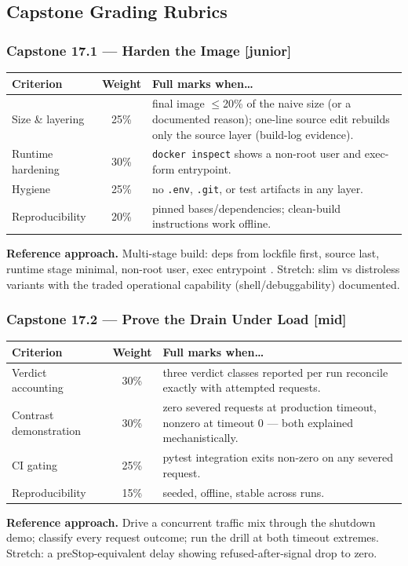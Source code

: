 \subsection{Capstone Grading Rubrics}

\subsubsection*{Capstone 17.1 --- Harden the Image [junior]}
\begin{center}\small
\begin{tabularx}{\textwidth}{l c X}
\toprule
\textbf{Criterion} & \textbf{Weight} & \textbf{Full marks when\ldots} \\
\midrule
Size \& layering & 25\% & final image $\le$20\% of the naive size (or a documented reason); one-line source edit rebuilds only the source layer (build-log evidence). \\
Runtime hardening & 30\% & \texttt{docker inspect} shows a non-root user and exec-form entrypoint. \\
Hygiene & 25\% & no \texttt{.env}, \texttt{.git}, or test artifacts in any layer. \\
Reproducibility & 20\% & pinned bases/dependencies; clean-build instructions work offline. \\
\bottomrule
\end{tabularx}
\end{center}
\textbf{Reference approach.} Multi-stage build: deps from lockfile first,
source last, runtime stage minimal, non-root user, exec entrypoint
\cite{twelvefactor}. Stretch: slim vs distroless variants with the traded
operational capability (shell/debuggability) documented.

\subsubsection*{Capstone 17.2 --- Prove the Drain Under Load [mid]}
\begin{center}\small
\begin{tabularx}{\textwidth}{l c X}
\toprule
\textbf{Criterion} & \textbf{Weight} & \textbf{Full marks when\ldots} \\
\midrule
Verdict accounting & 30\% & three verdict classes reported per run reconcile exactly with attempted requests. \\
Contrast demonstration & 30\% & zero severed requests at production timeout, nonzero at timeout 0 --- both explained mechanistically. \\
CI gating & 25\% & pytest integration exits non-zero on any severed request. \\
Reproducibility & 15\% & seeded, offline, stable across runs. \\
\bottomrule
\end{tabularx}
\end{center}
\textbf{Reference approach.} Drive a concurrent traffic mix through the
shutdown demo; classify every request outcome; run the drill at both
timeout extremes. Stretch: a preStop-equivalent delay showing
refused-after-signal drop to zero.

